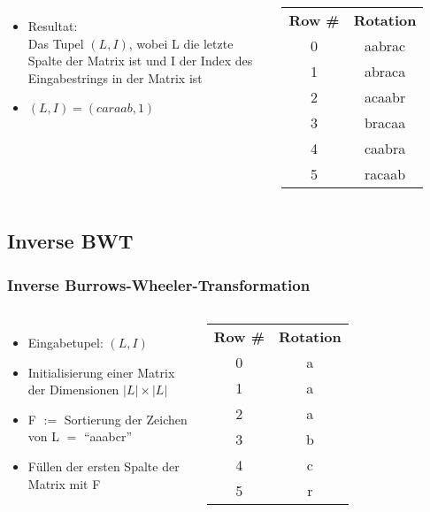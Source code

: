 \documentclass[14pt,xcolor=dvipsnames]{beamer}
\begin{document}
\begin{frame}[allowframebreaks]
\begin{columns}[c,onlytextwidth]
 \begin{itemize}
  \item Resultat:\\
      Das Tupel \textit{$(L,I)$}, wobei L die {\color{red}letzte Spalte} der Matrix ist
      und I der Index des {\color{darkgreen}Eingabestrings in der Matrix} ist
  \item $(L,I) = (caraab, 1)$
 \end{itemize}
    \begin{tabular}{c|c}
    \textbf{Row \#} & \textbf{Rotation} \\
    0 & aabra{\color{red}c} \\
    {\color{darkgreen}1} & {\color{darkgreen}abrac}{\color{red}a} \\
    2 & acaab{\color{red}r} \\
    3 & braca{\color{red}a} \\
    4 & caabr{\color{red}a} \\
    5 & racaa{\color{red}b} \\
    \end{tabular}
\end{columns}
\end{frame}
\subsection{Inverse BWT}
\begin{frame}[allowframebreaks]
\frametitle{Inverse Burrows-Wheeler-Transformation}
\begin{columns}[c,onlytextwidth]
 \begin{itemize}
  \item Eingabetupel: $(L,I)$
  \item Initialisierung einer Matrix der Dimensionen $|L| \times |L|$
  \item F $:=$ Sortierung der Zeichen von L $=$ ``aaabcr''
  \item Füllen der ersten Spalte der Matrix mit {\color{darkgreen}F}
 \end{itemize}
    \begin{tabular}{c|c}
    \textbf{Row \#} & \textbf{Rotation} \\
    0 & {\color{darkgreen}a} \\
    1 & {\color{darkgreen}a} \\
    2 & {\color{darkgreen}a} \\
    3 & {\color{darkgreen}b} \\
    4 & {\color{darkgreen}c} \\
    5 & {\color{darkgreen}r} \\
    \end{tabular}
\end{columns}
\framebreak
\begin{columns}[c,onlytextwidth]
\end{columns}
\end{frame}
\end{document}
